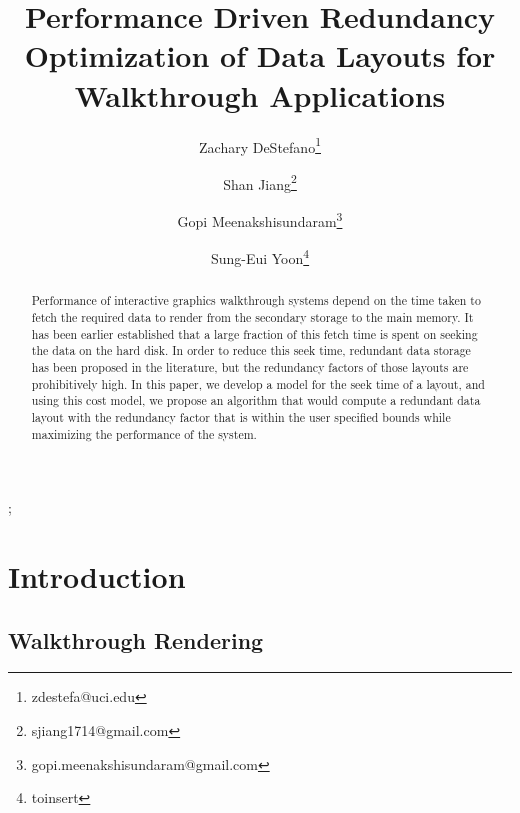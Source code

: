 \documentclass[conference]{acmsiggraph}
\title{Performance Driven Redundancy Optimization of Data Layouts for Walkthrough Applications}
\author[1]{Zachary DeStefano\thanks{zdestefa@uci.edu}}
\author[1]{Shan Jiang\thanks{sjiang1714@gmail.com}}
\author[1]{Gopi Meenakshisundaram\thanks{gopi.meenakshisundaram@gmail.com}}
\author[2]{Sung-Eui Yoon\thanks{toinsert}}
\affil[1]{University of California, Irvine}
\affil[2]{KAIST}
\begin{document}

\maketitle

\begin{abstract}

Performance of interactive graphics walkthrough systems depend on the time taken to fetch the required data to render from the secondary storage to the main memory. It has been earlier established that a large fraction of this fetch time is spent on seeking the data on the hard disk. In order to reduce this seek time, redundant data storage has been proposed in the literature, but the redundancy factors of those layouts are prohibitively high.  In this paper, we develop a model for the seek time of a layout, and using this cost model, we propose an algorithm that would compute a redundant data layout with the redundancy factor that is within the user specified bounds while maximizing the performance of the system.



\end{abstract}

\begin{CRcatlist}
  ;
\end{CRcatlist}

\keywordlist


\TOGlinkslist


\copyrightspace

\section{Introduction}

\subsection{Walkthrough Rendering}
\end{document}
